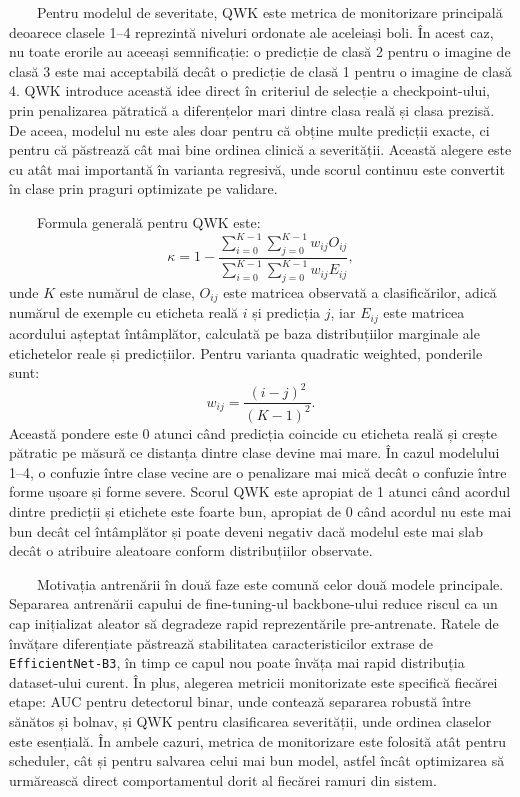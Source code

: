 \documentclass[12pt, a4paper, twoside, romanian]{teza-upb}
\begin{document}
\ \ \ \ Pentru modelul de severitate, QWK este metrica de monitorizare principală deoarece clasele
1--4 reprezintă niveluri ordonate ale aceleiași boli. În acest caz, nu toate erorile au aceeași
semnificație: o predicție de clasă 2 pentru o imagine de clasă 3 este mai acceptabilă decât o predicție
de clasă 1 pentru o imagine de clasă 4. QWK introduce această idee direct în criteriul de selecție a
checkpoint-ului, prin penalizarea pătratică a diferențelor mari dintre clasa reală și clasa prezisă.
De aceea, modelul nu este ales doar pentru că obține multe predicții exacte, ci pentru că păstrează cât
mai bine ordinea clinică a severității. Această alegere este cu atât mai importantă în varianta
regresivă, unde scorul continuu este convertit în clase prin praguri optimizate pe validare.
\bigskip

\ \ \ \ Formula generală pentru QWK este:
\[
\kappa = 1 - \frac{\sum_{i=0}^{K-1}\sum_{j=0}^{K-1} w_{ij} O_{ij}}
{\sum_{i=0}^{K-1}\sum_{j=0}^{K-1} w_{ij} E_{ij}},
\]
unde \(K\) este numărul de clase, \(O_{ij}\) este matricea observată a clasificărilor, adică numărul
de exemple cu eticheta reală \(i\) și predicția \(j\), iar \(E_{ij}\) este matricea acordului așteptat
întâmplător, calculată pe baza distribuțiilor marginale ale etichetelor reale și predicțiilor. Pentru
varianta quadratic weighted, ponderile sunt:
\[
w_{ij} = \frac{(i-j)^2}{(K-1)^2}.
\]
Această pondere este 0 atunci când predicția coincide cu eticheta reală și crește pătratic pe măsură
ce distanța dintre clase devine mai mare. În cazul modelului 1--4, o confuzie între clase vecine are
o penalizare mai mică decât o confuzie între forme ușoare și forme severe. Scorul QWK este apropiat de
1 atunci când acordul dintre predicții și etichete este foarte bun, apropiat de 0 când acordul nu este
mai bun decât cel întâmplător și poate deveni negativ dacă modelul este mai slab decât o atribuire
aleatoare conform distribuțiilor observate.
\bigskip

\ \ \ \ Motivația antrenării în două faze este comună celor două modele principale. Separarea
antrenării capului de fine-tuning-ul backbone-ului reduce riscul ca un cap inițializat aleator să
degradeze rapid reprezentările pre-antrenate. Ratele de învățare diferențiate păstrează stabilitatea
caracteristicilor extrase de \texttt{EfficientNet-B3}, în timp ce capul nou poate învăța mai rapid
distribuția dataset-ului curent. În plus, alegerea metricii monitorizate este specifică fiecărei
etape: AUC pentru detectorul binar, unde contează separarea robustă între sănătos și bolnav, și QWK
pentru clasificarea severității, unde ordinea claselor este esențială. În ambele cazuri, metrica de
monitorizare este folosită atât pentru scheduler, cât și pentru salvarea celui mai bun model, astfel
încât optimizarea să urmărească direct comportamentul dorit al fiecărei ramuri din sistem.
\end{document}
